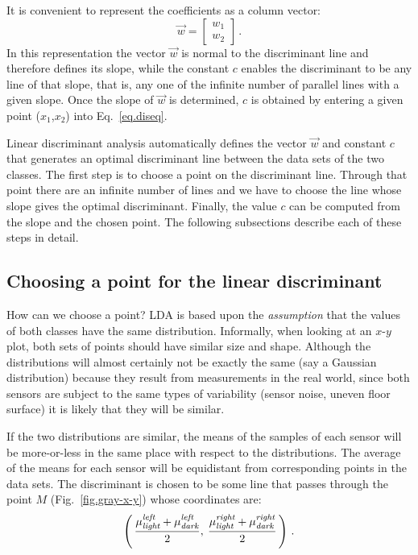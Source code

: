 It is convenient to represent the coefficients as a column vector:
\[
\vec{w} = \left[ \begin{array}{c} w_1\\w_2 \end{array} \right]\,.
\]
In this representation the vector $\vec{w}$ is normal to the discriminant line and therefore defines its slope, while the constant $c$ enables the discriminant to be any line of that slope, that is, any one of the infinite number of parallel lines with a given slope. Once the slope of $\vec{w}$ is determined, $c$ is obtained by entering a given point ($x_1$,$x_2$) into Eq.~\ref{eq.diseq}.

Linear discriminant analysis automatically defines the vector $\vec{w}$ and constant $c$ that generates an optimal discriminant line between the data sets of the two classes. The first step is to choose a point on the discriminant line. Through that point there are an infinite number of lines and we have to choose the line whose slope gives the optimal discriminant. Finally, the value $c$ can be computed from the slope and the chosen point. The following subsections describe each of these steps in detail.

\subsection{Choosing a point for the linear discriminant}

How can we choose a point? LDA is based upon the \emph{assumption} that the values of both classes have the same distribution. Informally, when looking at an $x$-$y$ plot, both sets of points should have similar size and shape. Although the distributions will almost certainly not be exactly the same (say a Gaussian distribution) because they result from measurements in the real world, since both sensors are subject to the same types of variability (sensor noise, uneven floor surface) it is likely that they will be similar.

If the two distributions are similar, the means of the samples of each sensor will be more-or-less in the same place with respect to the distributions. The average of the means for each sensor will be equidistant from corresponding points in the data sets. The discriminant is chosen to be some line that passes through the point $M$ (Fig.~\ref{fig.gray-x-y}) whose coordinates are:
\[
\left(\,
\frac{\mu_{\textit{\scriptsize light}}^{\textit{\scriptsize left }}+\mu_{\textit{\scriptsize dark}}^{\textit{\scriptsize left }}}{2},\:\frac{\mu_{\textit{\scriptsize light}}^{\textit{\scriptsize right}}+\mu_{\textit{\scriptsize dark}}^{\textit{\scriptsize right}}}{2}
\,\right)\,.
\]


